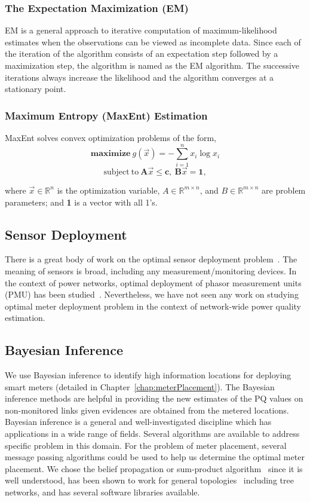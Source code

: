 \subsubsection{The Expectation Maximization (EM)} EM is a general approach to iterative computation of maximum-likelihood estimates when the observations can be viewed as incomplete data. Since each of the iteration of the algorithm consists of an expectation step followed by a maximization step, the algorithm is named as the EM algorithm. The successive iterations always increase the likelihood and the algorithm converges at a stationary point.

\subsubsection{Maximum Entropy (MaxEnt) Estimation} MaxEnt solves convex optimization problems of the form,
\[\mathrm{\mathbf{maximize}}~g(\vec{x}) = - \sum_{i=1}^n x_i \log x_i \]
\[\mathrm{subject~to~} \mathbf{A}\vec{x} \leq \mathbf{c},~ \mathbf{B}\vec{x} = \mathbf{1},\]

where $\vec{x}\in \mathbb{R}^n$ is the optimization variable, $A \in \mathbb{R}^{m \times n}$, and $B \in \mathbb{R}^{m \times n}$ are problem parameters;  and \textbf{1} is a vector with all 1's.

\subsection{Sensor Deployment}
There is a great body of work on the optimal sensor deployment problem~\cite{Krause09}. The meaning of sensors is broad, including any measurement/monitoring devices. In the context of power networks, optimal deployment of phasor measurement units (PMU) has been studied~\cite{Yuill11}. Nevertheless, we have not seen any work on studying optimal meter deployment problem in the context of network-wide power quality estimation.

\subsection{Bayesian Inference}
We use Bayesian inference to identify high information locations for deploying smart meters (detailed in Chapter~\ref{chap:meterPlacement}). The Bayesian inference methods are helpful in providing the new estimates of the PQ values on non-monitored links given evidences are obtained from the metered locations. Bayesian inference is a general and well-investigated discipline which has applications in a wide range of fields. Several algorithms are available to address specific problem in this domain. For the problem of meter placement, several message passing algorithms could be used to
help us determine the optimal meter placement. We chose the belief propagation or sum-product algorithm~\cite{pearl1988probabilistic} since it is well understood, has been shown to work for general topologies~\cite{yedidia2001generalized} including tree networks, and has several software libraries available.

